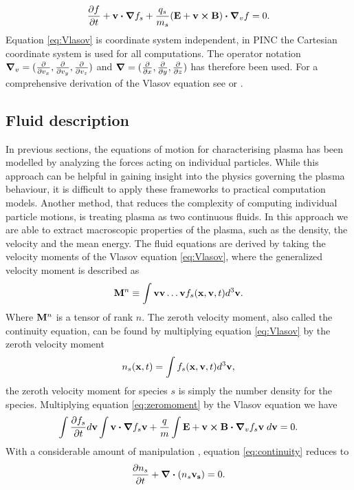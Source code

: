 \begin{equation}\label{eq:Vlasov}
    \pdv{f}{t} + \vb{v} \vdot \grad{f_s} + \frac{q_s}{m_s} (\vb{E} + \vb{v} \cp \vb{B}) \vdot \grad_v{f} = 0.
\end{equation}
Equation \eqref{eq:Vlasov} is coordinate system independent, in PINC the Cartesian coordinate system is used for all computations. The operator notation $\grad_v = (\pdv{v_x}, \pdv{v_y}, \pdv{v_z})$ and $\grad = (\pdv{x},\pdv{y},\pdv{z})$ has therefore been used. For a comprehensive derivation of the Vlasov equation see \parencite{Birdsall2004} or \parencite{Piel2017}.


\subsection{Fluid description}
In previous sections, the equations of motion for characterising plasma has been modelled by analyzing the forces acting on individual particles. While this approach can be helpful in gaining insight into the physics governing the plasma behaviour, it is difficult to apply these frameworks to practical computation models. 
\vskip 1mm
Another method, that reduces the complexity of computing individual particle motions, is treating plasma as two continuous fluids. In this approach we are able to extract macroscopic properties of the plasma, such as the density, the velocity and the mean energy. The fluid equations are derived by taking the velocity moments of the Vlasov equation \eqref{eq:Vlasov}, where the generalized velocity moment is described as
\begin{equation}\label{eq:moment}
    \vb{M}^n \equiv \int \vb{v}\vb{v} \ldots \vb{v} f_s(\vb{x}, \vb{v}, t) d^3 \vb{v}.
\end{equation}
Where $\vb{M}^n$ is a tensor of rank $n$. The zeroth velocity moment, also called the continuity equation, can be found by multiplying equation \eqref{eq:Vlasov} by the zeroth velocity moment 
\begin{equation}\label{eq:zeromoment}
    n_s(\vb{x}, t) = \int f_s(\vb{x}, \vb{v}, t) d^3 \vb{v},
\end{equation}
the zeroth velocity moment for species $s$ is simply the number density for the species. Multiplying equation \eqref{eq:zeromoment} by the Vlasov equation we have
\begin{equation}\label{eq:continuity}
    \int \pdv{f_s}{t} d \vb{v} \int \vb{v} \vdot \grad{f_s} \vb{v} + \frac{q}{m} \int \vb{E} + \vb{v} \cp \vb{B} \vdot \grad_v{f_s}{\vb{v}}  \;d \vb{v} = 0.
\end{equation}
With a considerable amount of manipulation \parencite[ch 7]{Chen2018}, equation \eqref{eq:continuity} reduces to
\begin{equation}\label{eq:contReduced}
    \pdv{n_s}{t} + \div{(n_s \vb{v_s})} = 0 .
\end{equation}

